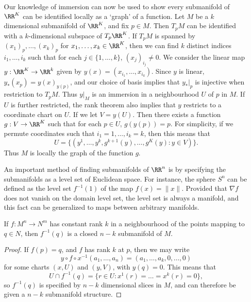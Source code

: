\begin{example}
    Our knowledge of immersion can now be used to show every submanifold of $\RR^K$ can be identified locally as a `graph' of a function. Let $M$ be a $k$ dimensional submanifold of $\RR^K$, and fix $p \in M$. Then $T_p M$ can be identified with a $k$-dimensional subspace of $T_p \RR^K$. If $T_p M$ is spanned by $(x_1)_p, \dots, (x_k)_p$ for $x_1, \dots, x_k \in \RR^K$, then we can find $k$ distinct indices $i_1, \dots, i_k$ such that for each $j \in \{ 1, \dots, k \}$, $(x_j)_{i_j} \neq 0$. We consider the linear map $y: \RR^K \to \RR^k$ given by $y(x) = (x_{i_1}, \dots, x_{i_k})$. Since $y$ is linear, $y_*(x_p) = y(x)_{y(p)}$, and our choice of basis implies that $y_*|_p$ is injective when restriction to $T_p M$. Thus $y|_M$ is an immersion in a neighbourhood $U$ of $p$ in $M$. If $U$ is further restricted, the rank theorem also implies that $y$ restricts to a coordinate chart on $U$. If we let $V = y(U)$. Then there exists a function $g: V \to \RR^K$ such that for each $p \in U$, $g(y(p)) = p$. For simplicity, if we permute coordinates such that $i_1 = 1, \dots, i_k = k$, then this means that
    \[ U = \{ (y^1, \dots, y^k, g^{k+1}(y), \dots, g^K(y): y \in V) \}. \]
    Thus $M$ is locally the graph of the function $g$.
\end{example}

An important method of finding submanifolds of $\RR^n$ is by specifying the submanifolds as a level set of Euclidean space. For instance, the sphere $S^n$ can be defined as the level set $f^{-1}(1)$ of the map $f(x) = \| x \|$. Provided that $\nabla f$ does not vanish on the domain level set, the level set is always a manifold, and this fact can be generalized to maps between arbitrary manifolds.

\begin{theorem}
    If $f: M^n \to N^m$ has constant rank $k$ in a neighbourhood of the points mapping to $q \in N$, then $f^{-1}(q)$ is a closed $n - k$ submanifold of $M$.
\end{theorem}
\begin{proof}
    If $f(p) = q$, and $f$ has rank $k$ at $p$, then we may write
    \[ y \circ f \circ x^{-1}(a_1, \dots, a_n) = (a_1, \dots, a_k, 0 ,\dots, 0) \]
    for some charts $(x,U)$ and $(y,V)$, with $y(q) = 0$. This means that
    \[ U \cap f^{-1}(q) = \{ r \in U : x^1(r) = \dots = x^k(r) = 0 \}, \]
    so $f^{-1}(q)$ is specified by $n-k$ dimensional slices in $M$, and can therefore be given a $n-k$ submanifold structure.
\end{proof}

